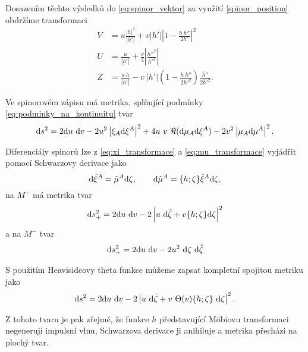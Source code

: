 Dosazením těchto výsledků do \eqref{eq:spinor_vektor} za využití \eqref{spinor_position} obdržíme
transformaci
\begin{equation}
    \begin{split}
        V &= u \frac{\left|h\right|^2}{\left|h'\right|} + v \left| h' \right| \left| 1 - \frac{h ~ h''}{2 h'} \right|^2 \\
        U &= \frac{u}{\left|h'\right|} + \frac{v}{4} \left| \frac{h''^2}{h'^3}\right| \\
        Z &= \frac{u ~ h}{ \left| h' \right|} - v ~ \left| h' \right| \left(1 - \frac{h ~ h''}{2 h'^2} \right) \frac{\bar{h}''}{2 \bar{h}'^2}.
    \end{split}
\end{equation}

Ve spinorovém zápisu má metrika, splňující podmínky \eqref{eq:podminky_na_kontinuitu} tvar
\begin{equation}
    \mathrm{d} s^2 = 2 \mathrm{d} u ~ \mathrm{d} v - 2 u^2 \left| \xi_A \mathrm{d} \xi^A \right|^2 + 4 u~v~ \Re(\mathrm{d} \mu_A \mathrm{d} \xi^A) - 2 v^2 \left|\mu_A \mathrm{d} \mu^A\right|^2.
\end{equation}

Diferenciály spinorů lze z \eqref{eq:xi_transformace} a \eqref{eq:mu_transformace} vyjádřit pomocí Schwarzovy derivace jako
\begin{equation}
    \mathrm{d} \hat{\xi}^A = \hat{\mu}^A \mathrm{d} \zeta, ~~~~~~ \mathrm{d} \hat{\mu}^A = \{h; \zeta\} \hat{\xi}^A \mathrm{d} \zeta,
\end{equation}
na $M^+$ má metrika tvar
\begin{equation}
    \mathrm{d} s_+^2 = 2 \mathrm{d} u ~ \mathrm{d} v - 2 \left| u ~ \mathrm{d} \hat{\zeta} + v \{h; \zeta \} \mathrm{d} \zeta \right|^2
\end{equation}
a na $M^-$ tvar
\begin{equation}
    \mathrm{d} s_+^2 = 2 \mathrm{d} u ~ \mathrm{d} v - 2 u^2 ~ \mathrm{d} \zeta ~ \mathrm{d} \hat{\zeta}
\end{equation}

S použitím Heavisideovy theta funkce můžeme zapsat kompletní spojitou metriku
jako
\begin{equation}
    \mathrm{d} s^2 = 2 \mathrm{d} u ~ \mathrm{d} v - 2 \left| u ~ \mathrm{d} \bar{\zeta} + v ~ \Theta(v) \{h;\zeta\} ~ \mathrm{d} \zeta \right|^2.
\end{equation}

Z tohoto tvaru je pak zřejmé, že funkce $h$ představující Möbiovu transformaci negenerují impulsní vlnu,
Schwarzova derivace ji anihiluje a metrika přechází na plochý tvar.


